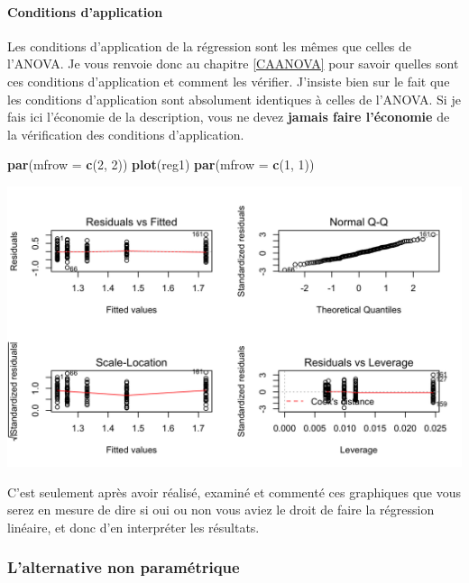 \documentclass[a4paperpaper,]{article}
\newenvironment{Shaded}{\begin{snugshade}}{\end{snugshade}}
\newcommand{\DataTypeTok}[1]{\textcolor[rgb]{0.00,0.34,0.68}{#1}}
\newcommand{\DecValTok}[1]{\textcolor[rgb]{0.69,0.50,0.00}{#1}}
\newcommand{\KeywordTok}[1]{\textcolor[rgb]{0.12,0.11,0.11}{\textbf{#1}}}
\newcommand{\NormalTok}[1]{\textcolor[rgb]{0.12,0.11,0.11}{#1}}
\let\oldparagraph\paragraph
\renewcommand{\paragraph}[1]{\oldparagraph{#1}\mbox{}}
\begin{document}
\hypertarget{conditions-dapplication-4}{%
\paragraph{Conditions d'application}\label{conditions-dapplication-4}}

Les conditions d'application de la régression sont les mêmes que celles de l'ANOVA. Je vous renvoie donc au chapitre \ref{CAANOVA} pour savoir quelles sont ces conditions d'application et comment les vérifier. J'insiste bien sur le fait que les conditions d'application sont absolument identiques à celles de l'ANOVA. Si je fais ici l'économie de la description, vous ne devez \textbf{jamais faire l'économie} de la vérification des conditions d'application.

\begin{Shaded}
\begin{Highlighting}[]
\KeywordTok{par}\NormalTok{(}\DataTypeTok{mfrow =} \KeywordTok{c}\NormalTok{(}\DecValTok{2}\NormalTok{, }\DecValTok{2}\NormalTok{))}
\KeywordTok{plot}\NormalTok{(reg1)}
\KeywordTok{par}\NormalTok{(}\DataTypeTok{mfrow =} \KeywordTok{c}\NormalTok{(}\DecValTok{1}\NormalTok{, }\DecValTok{1}\NormalTok{))}
\end{Highlighting}
\end{Shaded}

\begin{center}\includegraphics[width=0.9\linewidth]{figure/unnamed-chunk-122-1} \end{center}

C'est seulement après avoir réalisé, examiné et commenté ces graphiques que vous serez en mesure de dire si oui ou non vous aviez le droit de faire la régression linéaire, et donc d'en interpréter les résultats.

\hypertarget{lalternative-non-parametrique-5}{%
\subsubsection{L'alternative non paramétrique}\label{lalternative-non-parametrique-5}}
\end{document}
